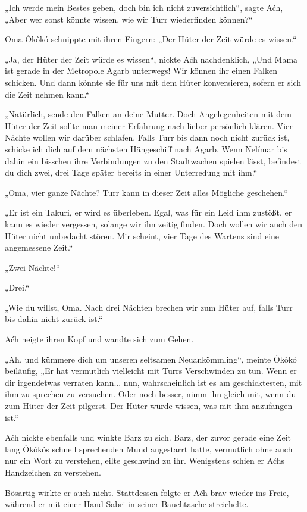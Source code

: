 „Ich werde mein Bestes geben, doch bin ich nicht zuversichtlich“, sagte Aćh, „Aber wer sonst könnte wissen, wie wir Turr wiederfinden können?“

Oma Òkôkó schnippte mit ihren Fingern: „Der Hüter der Zeit würde es wissen.“

„Ja, der Hüter der Zeit würde es wissen“, nickte Aćh nachdenklich, „Und Mama ist gerade in der Metropole Agarb unterwegs! Wir können ihr einen Falken schicken. Und dann könnte sie für uns mit dem Hüter konversieren, sofern er sich die Zeit nehmen kann.“

„Natürlich, sende den Falken an deine Mutter. Doch Angelegenheiten mit dem Hüter der Zeit sollte man meiner Erfahrung nach lieber persönlich klären. Vier Nächte wollen wir darüber schlafen. Falls Turr bis dann noch nicht zurück ist, schicke ich dich auf dem nächsten Hängeschiff nach Agarb. Wenn Nelímar bis dahin ein bisschen ihre Verbindungen zu den Stadtwachen spielen lässt, befindest du dich zwei, drei Tage später bereits in einer Unterredung mit ihm.“

„Oma, vier ganze Nächte? Turr kann in dieser Zeit alles Mögliche geschehen.“

„Er ist ein Takuri, er wird es überleben. Egal, was für ein Leid ihm zustößt, er kann es wieder vergessen, solange wir ihn zeitig finden. Doch wollen wir auch den Hüter nicht unbedacht stören. Mir scheint, vier Tage des Wartens sind eine angemessene Zeit.“

„Zwei Nächte!“

„Drei.“

„Wie du willst, Oma. Nach drei Nächten brechen wir zum Hüter auf, falls Turr bis dahin nicht zurück ist.“

Aćh neigte ihren Kopf und wandte sich zum Gehen.

„Ah, und kümmere dich um unseren seltsamen Neuankömmling“, meinte Òkôkó beiläufig, „Er hat vermutlich vielleicht mit Turrs Verschwinden zu tun. Wenn er dir irgendetwas verraten kann... nun, wahrscheinlich ist es am geschicktesten, mit ihm zu sprechen zu versuchen. Oder noch besser, nimm ihn gleich mit, wenn du zum Hüter der Zeit pilgerst. Der Hüter würde wissen, was mit ihm anzufangen ist.“

Aćh nickte ebenfalls und winkte Barz zu sich. Barz, der zuvor gerade eine Zeit lang Òkôkós schnell sprechenden Mund angestarrt hatte, vermutlich ohne auch nur ein Wort zu verstehen, eilte geschwind zu ihr. Wenigstens schien er Aćhs Handzeichen zu verstehen.

Bösartig wirkte er auch nicht. Stattdessen folgte er Aćh brav wieder ins Freie, während er mit einer Hand Sabri in seiner Bauchtasche streichelte.

